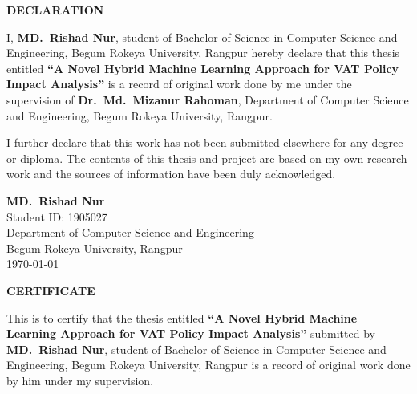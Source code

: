 \newpage
\thispagestyle{empty}
\vspace*{4cm}

\begin{center}
    {\Large\bfseries DECLARATION}
\end{center}

\vspace{1cm}

I, \textbf{MD.\ Rishad Nur}, student of Bachelor of Science in Computer Science and Engineering, Begum Rokeya University, Rangpur hereby declare that this thesis entitled \textbf{``A Novel Hybrid Machine Learning Approach for VAT Policy Impact Analysis''} is a record of original work done by me under the supervision of \textbf{Dr.\ Md.\ Mizanur Rahoman}, Department of Computer Science and Engineering, Begum Rokeya University, Rangpur.

\vspace{1cm}

I further declare that this work has not been submitted elsewhere for any degree or diploma. The contents of this thesis and project are based on my own research work and the sources of information have been duly acknowledged.

\vspace{3cm}

\begin{flushright}
    \textbf{MD.\ Rishad Nur}\\
    Student ID: 1905027\\
    Department of Computer Science and Engineering\\
    Begum Rokeya University, Rangpur\\
    \today
\end{flushright}

\newpage
\thispagestyle{empty}
\vspace*{2cm}

\begin{center}
    {\Large\bfseries CERTIFICATE}
\end{center}

\vspace{1cm}

This is to certify that the thesis entitled \textbf{``A Novel Hybrid Machine Learning Approach for VAT Policy Impact Analysis''} submitted by \textbf{MD.\ Rishad Nur}, student of Bachelor of Science in Computer Science and Engineering, Begum Rokeya University, Rangpur is a record of original work done by him under my supervision.

